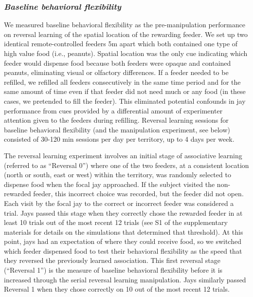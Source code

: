 \documentclass[
]{article}
\begin{document}
\subsubsection{\texorpdfstring{\emph{Baseline behavioral
flexibility}}{Baseline behavioral flexibility}}\label{baseline-behavioral-flexibility}

We measured baseline behavioral flexibility as the pre-manipulation
performance on reversal learning of the spatial location of the
rewarding feeder. We set up two identical remote-controlled feeders 5m
apart which both contained one type of high value food (i.e., peanuts).
Spatial location was the only cue indicating which feeder would dispense
food because both feeders were opaque and contained peanuts, eliminating
visual or olfactory differences. If a feeder needed to be refilled, we
refilled all feeders consecutively in the same time period and for the
same amount of time even if that feeder did not need much or any food
(in these cases, we pretended to fill the feeder). This eliminated
potential confounds in jay performance from cues provided by a
differential amount of experimenter attention given to the feeders
during refilling. Reversal learning sessions for baseline behavioral
flexibility (and the manipulation experiment, see below) consisted of
30-120 min sessions per day per territory, up to 4 days per week.

The reversal learning experiment involves an initial stage of
associative learning (referred to as ``Reversal 0'') where one of the
two feeders, at a consistent location (north or south, east or west)
within the territory, was randomly selected to dispense food when the
focal jay approached. If the subject visited the non-rewarded feeder,
this incorrect choice was recorded, but the feeder did not open. Each
visit by the focal jay to the correct or incorrect feeder was considered
a trial. Jays passed this stage when they correctly chose the rewarded
feeder in at least 10 trials out of the most recent 12 trials (see S1 of
the supplementary materials for details on the simulations that
determined that threshold). At this point, jays had an expectation of
where they could receive food, so we switched which feeder dispensed
food to test their behavioral flexibility as the speed that they
reversed the previously learned association. This first reversal stage
(``Reversal 1'') is the measure of baseline behavioral flexibility
before it is increased through the serial reversal learning
manipulation. Jays similarly passed Reversal 1 when they chose correctly
on 10 out of the most recent 12 trials.
\end{document}
